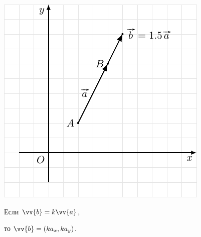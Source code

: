 \documentclass[10pt]{beamer}
\begin{document}
    
    {
    	{
    		
			\includegraphics{normalize.pdf}
    		
    		
    	}
    	{
    		Если $\vv{b} = k\vv{a}$, 
    		
    		\hfill
    		
    		то $\vv{b}  = (ka_x, ka_y)$.
    		

    		
    		
    	}
    	
    }
    
\end{document}
